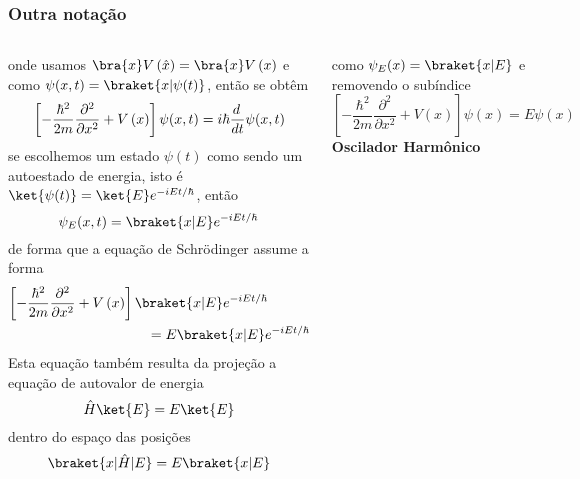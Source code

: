 \documentclass[12pt,brazil,table]{beamer}
\begin{document}
\begin{frame}
  \frametitle{Outra notação}
  \fontsize{7pt}{11pt}\selectfont
  
  \begin{columns}[T]
  
  onde usamos $\bra{x}V\left(\hat{x}\right) = \bra{x}V\left(x\right)$ e como $\psi (x,t)=\braket{x|\psi(t)}$, então se obtêm\vspace*{-0.25cm}
  \[
    \left[-\dfrac{\hbar^2}{2m}\dfrac{\partial^2 }{\partial  x^2} + V\left(x\right)\right]\psi (x,t)=i\hbar \dfrac{d\,}{dt}\psi (x,t)\vspace*{-0.25cm}
  \]
  se escolhemos um estado $\psi(t)$ como sendo um autoestado de energia, isto é $\ket{\psi(t)}=\ket{E}e^{-iEt/\hbar}$, então\vspace*{-0.25cm}
  \[
    \psi_E (x,t) =\braket{x|E}e^{-iEt/\hbar}\vspace*{-0.25cm}
  \]
  de forma que a equação de Schrödinger assume a forma
  \[
    \begin{align*}
      \left[-\dfrac{\hbar^2}{2m}\dfrac{\partial^2 }{\partial  x^2} + V\left(x\right)\right]\braket{x|E}e^{-iEt/\hbar} \qquad\quad&\\
    \qquad = E\braket{x|E}e^{-iEt/\hbar} 
    \end{align*}\vspace*{-0.25cm}
  \]
  Esta equação também resulta da projeção a equação de autovalor de energia\vspace*{-0.25cm}
  \[
   \hat{H}\ket{E}=E\ket{E}\vspace*{-0.25cm}
  \]
  dentro do espaço das posições\vspace*{-0.25cm}
  \[
   \braket{x|\hat{H}|E}=E\braket{x|E}
  \]
  
  \vspace*{-0.8cm}
  como $\psi_E (x)=\braket{x|E}$ e removendo o subíndice
  \[
   \left[-\dfrac{\hbar^2}{2m}\dfrac{\partial^2 }{\partial  x^2} + V\left(x\right)\right]\psi (x) = E\psi (x)
  \]
  \textbf{Oscilador Harmônico}\\\vspace*{-0.25cm}
  

\end{columns}
\end{frame}
\end{document}
